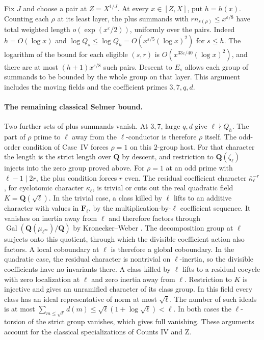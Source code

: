 Fix \(J\) and choose a pair at \(Z=X^{1/J}\). At every
\(x\in[Z,X]\), put \(h=h(x)\). Counting each \(\rho\) at its least
layer, the plus summands with \(r n_{s(\rho)}\le x^{\varepsilon/8}\)
have total weighted length \(o(\exp(x^\varepsilon/2))\), uniformly
over the pairs. Indeed \(h=O(\log x)\) and
\(\log Q_s\le\log Q_h=O(x^{\varepsilon/5}(\log x)^2)\) for \(s\le h\).
The logarithm of the bound for each eligible \((s,r)\) is
\(O(x^{33\varepsilon/40}(\log x)^2)\), and there are at most
\((h+1)x^{\varepsilon/8}\) such pairs. Descent to \(E_s\) allows
each group of summands to be bounded by the whole group on that
layer. This argument includes the moving fields and the
coefficient primes \(3,7,q,d\).

\paragraph{The remaining classical Selmer bound.}
%
Two further sets of plus summands vanish. At \(3,7\), large \(q,d\)
give \(\ell\nmid Q_h\). The part of \(\rho\) prime to \(\ell\) away
from the \(\ell\)-conductor is therefore \(\rho\) itself. The
odd-order condition of Case~IV forces \(\rho=1\) on this \(2\)-group
host. For that character the length is the strict length over
\(\mathbf Q\) by descent, and restriction to
\(\mathbf Q(\zeta_\ell)\) injects into the zero group proved above.
For \(\rho=1\) at an odd prime with \(\ell-1\mid 2r\), the plus
condition forces \(r\) even. The residual coefficient character
\(\bar\kappa_\ell^{-r}\), for cyclotomic character \(\kappa_\ell\),
is trivial or cuts out the real quadratic field
\(K=\mathbf Q(\sqrt{\ell})\).
In the trivial case, a class killed by \(\ell\) lifts to an
additive character with values in \(\mathbf F_\ell\), by the
multiplication-by-\(\ell\) coefficient sequence. It vanishes on
inertia away from \(\ell\) and therefore factors through
\(\operatorname{Gal}(\mathbf Q(\mu_{\ell^\infty})/\mathbf Q)\)
by Kronecker--Weber \cite[Ch.~I, Theorem~4.16]{f1milne-cft}.
The decomposition group at \(\ell\) surjects onto this quotient,
through which the divisible coefficient
action also factors. A local coboundary at \(\ell\) is therefore
a global coboundary. In the quadratic case, the residual
character is nontrivial on \(\ell\)-inertia, so the divisible
coefficients have no invariants there. A class killed by
\(\ell\) lifts to a residual cocycle with zero localization at
\(\ell\) and zero inertia away from \(\ell\). Restriction to
\(K\) is injective and gives an unramified character of its class
group. In this field every class has an ideal representative of
norm at most \(\sqrt\ell\). The number of such ideals is at most
\(\sum_{m\le\sqrt\ell}d(m)\le\sqrt\ell(1+\log\sqrt\ell)<\ell\).
In both cases the \(\ell\)-torsion of the strict group vanishes,
which gives full vanishing. These arguments account for the
classical specializations of Counts IV and Z.

